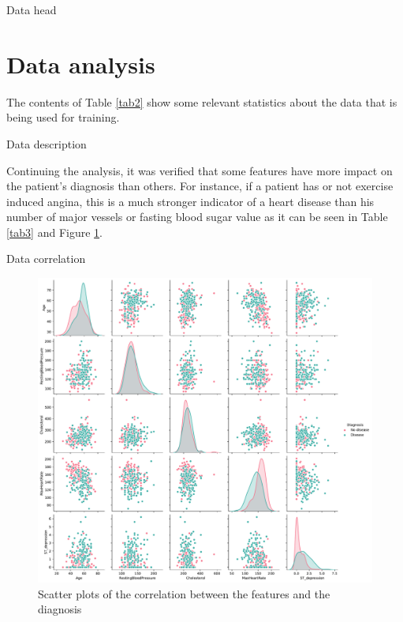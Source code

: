 \documentclass[conference]{IEEEtran}
\begin{document}
\begin{table}[htbp]
    \caption{Data head}
    \begin{center}
        \resizebox{\columnwidth}{!}{%
            
        }%
        \label{tab1}
    \end{center}
\end{table}

\section{Data analysis}

The contents of Table \ref{tab2} show some relevant statistics about the data that is being used for training.

\begin{table}[htbp]
    \caption{Data description}
    \begin{center}
        \resizebox{\columnwidth}{!}{%
            
        }%
        \label{tab2}
    \end{center}
\end{table}

Continuing the analysis, it was verified that some features have more impact on the patient's diagnosis than others. For instance, if a patient has or not exercise induced angina, this is a much stronger indicator of a heart disease than his number of major vessels or fasting blood sugar value as it can be seen in Table \ref{tab3} and Figure \ref{fig1}.

\begin{table}[htbp]
    \caption{Data correlation}
    \begin{center}
        
        \label{tab3}
    \end{center}
\end{table}

\begin{figure}[H]
    \centerline{\includegraphics[width=0.8\linewidth]{images/correlation_scatter.pdf}}
    \caption{Scatter plots of the correlation between the features and the diagnosis}
    \label{fig1}
\end{figure}
\end{document}
